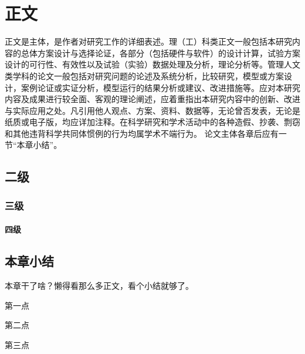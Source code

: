 
\chapter{正文}

正文是主体，是作者对研究工作的详细表述。理（工）科类正文一般包括本研究内容的总体方案设计与选择论证，各部分（包括硬件与软件）的设计计算，试验方案设计的可行性、有效性以及试验（实验）数据处理及分析，理论分析等。管理人文类学科的论文一般包括对研究问题的论述及系统分析，比较研究，模型或方案设计，案例论证或实证分析，模型运行的结果分析或建议、改进措施等。应对本研究内容及成果进行较全面、客观的理论阐述，应着重指出本研究内容中的创新、改进与实际应用之处。凡引用他人观点、方案、资料、数据等，无论曾否发表，无论是纸质或电子版，均应详加注释。在科学研究和学术活动中的各种造假、抄袭、剽窃和其他违背科学共同体惯例的行为均属学术不端行为。
论文主体各章后应有一节“本章小结”。
\section{二级}
\subsection{三级}
\subsubsection{四级}
\indent
\section{本章小结}
本章干了啥？懒得看那么多正文，看个小结就够了。
\begin{asparaenum}[1)]
	\item 第一点
	\item 第二点
	\item 第三点
\end{asparaenum}


